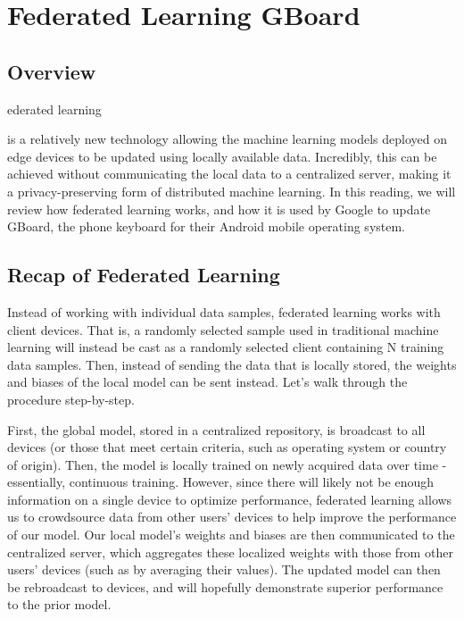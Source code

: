 {{{{{{{{{\section{Federated Learning GBoard}


    \subsection{Overview}
    
    \textbf{}ederated learning} is a relatively new technology allowing the machine learning models deployed on edge devices to be updated using locally available data. Incredibly, this can be achieved without communicating the local data to a centralized server, making it a privacy-preserving form of distributed machine learning. In this reading, we will review how federated learning works, and how it is used by Google to update GBoard, the phone keyboard for their Android mobile operating system.
    
    \subsection{Recap of Federated Learning}
    
    Instead of working with individual data samples, federated learning works with client devices. That is, a randomly selected sample used in traditional machine learning will instead be cast as a randomly selected client containing N training data samples. Then, instead of sending the data that is locally stored, the weights and biases of the local model can be sent instead. Let’s walk through the procedure step-by-step.
    
    First, the global model, stored in a centralized repository, is broadcast to all devices (or those that meet certain criteria, such as operating system or country of origin). Then, the model is locally trained on newly acquired data over time - essentially, continuous training. However, since there will likely not be enough information on a single device to optimize performance, federated learning allows us to crowdsource data from other users’ devices to help improve the performance of our model. Our local model’s weights and biases are then communicated to the centralized server, which aggregates these localized weights with those from other users’ devices (such as by averaging their values). The updated model can then be rebroadcast to devices, and will hopefully demonstrate superior performance to the prior model.
    
}}}}}}}}
